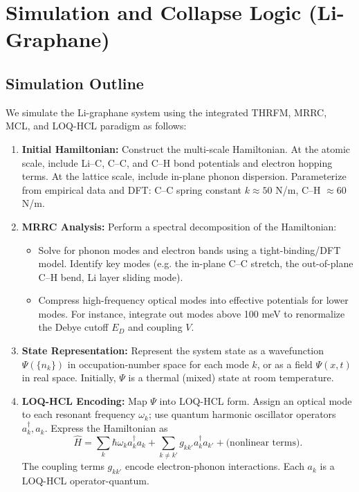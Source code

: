 \documentclass[11pt,a4paper]{article}
\begin{document}
\section{Simulation and Collapse Logic (Li-Graphane)}
\label{sec:simulation_collapse_logic_detailed}

\subsection{Simulation Outline}
\label{subsec:simulation_outline_detailed}
We simulate the Li-graphane system using the integrated THRFM, MRRC, MCL, and LOQ-HCL paradigm as follows:
\begin{enumerate}
\item \textbf{Initial Hamiltonian:} Construct the multi-scale Hamiltonian. At the atomic scale, include Li–C, C–C, and C–H bond potentials and electron hopping terms. At the lattice scale, include in-plane phonon dispersion. Parameterize from empirical data and DFT: C–C spring constant $k \approx 50$ N/m, C–H $\approx 60$ N/m.
\item \textbf{MRRC Analysis:} Perform a spectral decomposition of the Hamiltonian:
\begin{itemize}
\item Solve for phonon modes and electron bands using a tight-binding/DFT model. Identify key modes (e.g. the in-plane C–C stretch, the out-of-plane C–H bend, Li layer sliding mode).
\item Compress high-frequency optical modes into effective potentials for lower modes. For instance, integrate out modes above 100 meV to renormalize the Debye cutoff $E_D$ and coupling $V$.
\end{itemize}
\item \textbf{State Representation:} Represent the system state as a wavefunction $\Psi(\{n_k\})$ in occupation-number space for each mode $k$, or as a field $\Psi(x,t)$ in real space. Initially, $\Psi$ is a thermal (mixed) state at room temperature.
\item \textbf{LOQ-HCL Encoding:} Map $\Psi$ into LOQ-HCL form. Assign an optical mode to each resonant frequency $\omega_k$; use quantum harmonic oscillator operators $a_k^\dagger, a_k$. Express the Hamiltonian as
\begin{equation}
\hat{H} = \sum_k \hbar\omega_k a_k^\dagger a_k + \sum_{k\neq k'} g_{kk'} a_k^\dagger a_{k'} + \text{(nonlinear terms)}.
\end{equation}
The coupling terms $g_{kk'}$ encode electron-phonon interactions. Each $a_k$ is a LOQ-HCL operator-quantum.

\end{enumerate}
\end{document}
